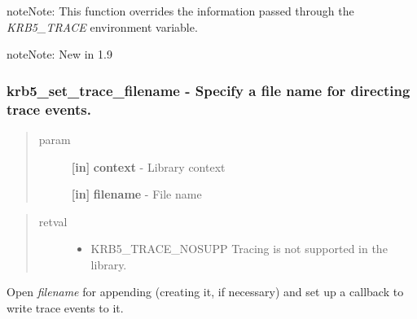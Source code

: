 \documentclass[letterpaper,10pt,english]{sphinxmanual}
\begin{document}
\begin{notice}{note}{Note:}
This function overrides the information passed through the \emph{KRB5\_TRACE} environment variable.
\end{notice}

\begin{notice}{note}{Note:}
New in 1.9
\end{notice}


\subsubsection{krb5\_set\_trace\_filename -  Specify a file name for directing trace events.}
\label{appdev/refs/api/krb5_set_trace_filename:krb5-set-trace-filename-specify-a-file-name-for-directing-trace-events}\label{appdev/refs/api/krb5_set_trace_filename::doc}

\begin{fulllineitems}
\label{appdev/refs/api/krb5_set_trace_filename:c.krb5_set_trace_filename}
\end{fulllineitems}

\begin{quote}\begin{description}
\item[{param}] \leavevmode
\textbf{{[}in{]}} \textbf{context} - Library context

\textbf{{[}in{]}} \textbf{filename} - File name

\end{description}\end{quote}
\begin{quote}\begin{description}
\item[{retval}] \leavevmode\begin{itemize}
\item {} 
KRB5\_TRACE\_NOSUPP   Tracing is not supported in the library.

\end{itemize}

\end{description}\end{quote}

Open \emph{filename} for appending (creating it, if necessary) and set up a callback to write trace events to it.
\end{document}
